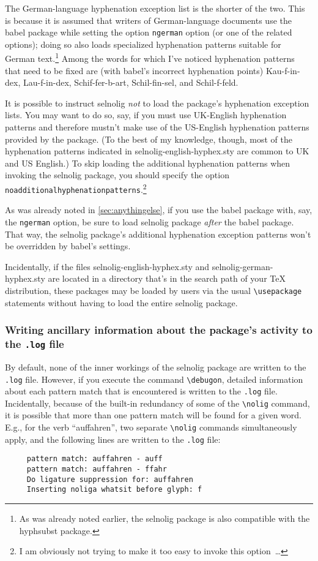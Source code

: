 \documentclass[12pt]{article}
\newcommand{\pkg}[1]{\textsf{#1}}
\newcommand{\opt}[1]{\texttt{#1}}
\newcommand{\cmmd}[1]{\texttt{\textbackslash #1}}
\begin{document}
The German-language hyphenation exception list is the shorter of the two. This is because it is assumed that writers of German-language documents use the \pkg{babel} package while setting the option \opt{ngerman} option (or one of the related options); doing so also loads specialized hyphenation patterns suitable for German text.\footnote{As was already noted earlier, the \pkg{selnolig} package is also compatible with the \pkg{hyphsubst} package.} Among the words for which I've noticed hyphenation patterns that need to be fixed are (with \pkg{babel}'s incorrect hyphenation points) Kau-f-in-dex, Lau-f-in-dex, Schif-fer-b-art, Schil-fin-sel, and Schil-f-feld.

It is possible to instruct \pkg{selnolig} \emph{not} to load the package's hyphenation exception lists. You may want to do so, say, if you must use UK-English hyphenation patterns and therefore mustn't make use of the US-English hyphenation patterns provided by the package. (To the best of my knowledge, though, most of the hyphenation patterns indicated in \pkg{selnolig-english-hyphex.sty} are common to UK and US English.) To skip loading the additional hyphenation patterns when invoking the \pkg{selnolig} package, you should specify the option \opt{noadditional\-hyphen\-a\-tion\-patterns}.\footnote{I am obviously not trying to make it too easy to invoke this option~\dots}

As was already noted in \cref{sec:anythingelse}, if you use the \pkg{babel} package with, say, the \opt{ngerman} option, be sure to load \pkg{selnolig} package \emph{after} the \pkg{babel} package. That way, the \pkg{selnolig} package's additional hyphenation exception patterns won't be overridden by \pkg{babel}'s settings.

Incidentally, if the files \pkg{selnolig-english-hyphex.sty} and \pkg{selnolig-german-hyphex.sty} are located in a directory that's in the search path of your TeX distribution, these packages may be loaded by users via the usual \cmmd{usepackage} statements without having to load the entire \pkg{selnolig} package.


\subsubsection{Writing ancillary information about the package's activity to the \opt{.log} file} \label{sec:debugon}

By default, none of the inner workings of the \pkg{selnolig} package are written to the \opt{.log} file. However, if you execute the command \cmmd{debugon}, detailed information about each pattern match that is encountered is written to the \opt{.log} file. Incidentally, because of the built-in redundancy of some of the \cmmd{nolig} command, it is possible that more than one pattern match will be found for a given word. E.g., for the verb \enquote{auffahren}, two separate \cmmd{nolig} commands simultaneously apply, and the following lines are written to the \opt{.log} file:
\begin{Verbatim}
     pattern match: auffahren - auff
     pattern match: auffahren - ffahr
     Do ligature suppression for: auffahren
     Inserting noliga whatsit before glyph: f
\end{Verbatim}
\end{document}
